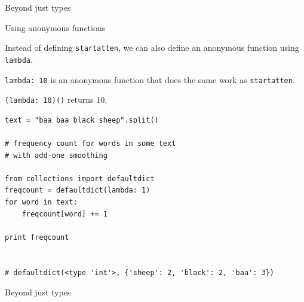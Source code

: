 \documentclass{beamer}
\begin{document}
\begin{frame}{Beyond just types}
 
\vspace{1.5em}
{\usebox{\mysavebox}}


\vspace{1em}
\end{frame}

\begin{frame}{Using anonymous functions}


Instead of defining \lstinline$startatten$, we can also define an anonymous function using \lstinline$lambda$.

\bigskip

\lstinline$lambda: 10$ is an anonymous function that does the same work as \lstinline$startatten$.

\bigskip

\lstinline$(lambda: 10)()$ returns 10.
\end{frame}

%
%
%
%
%
%
%
%
%


\begin{lrbox}{\mysavebox}
\begin{lstlisting}
text = "baa baa black sheep".split()

# frequency count for words in some text
# with add-one smoothing

from collections import defaultdict
freqcount = defaultdict(lambda: 1)
for word in text:
    freqcount[word] += 1

print freqcount 


# defaultdict(<type 'int'>, {'sheep': 2, 'black': 2, 'baa': 3})

\end{lstlisting}
\end{lrbox}

\begin{frame}{Beyond just types}
 
\vspace{-1em}
{\usebox{\mysavebox}}

\vspace{1em}
\end{frame}
\end{document}
